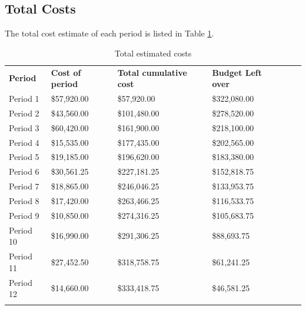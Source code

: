 \subsection{Total Costs}

The total cost estimate of each period is listed in Table \ref{tab:totalcosts}.


\begin{table}[]
\centering
\caption{Total estimated costs}
\label{tab:totalcosts}
\begin{tabular}{llllll}
\textbf{Period} & \textbf{Cost of period} & \textbf{Total cumulative cost} & \textbf{Budget Left over}           &  &  \\
Period 1        & \$57,920.00             & \$57,920.00                    & \$322,080.00                        &  &  \\
Period 2        & \$43,560.00             & \$101,480.00                   & \$278,520.00                        &  &  \\
Period 3        & \$60,420.00             & \$161,900.00                   & \$218,100.00                        &  &  \\
Period 4        & \$15,535.00             & \$177,435.00                   & \$202,565.00                        &  &  \\
Period 5        & \$19,185.00             & \$196,620.00                   & \$183,380.00                        &  &  \\
Period 6        & \$30,561.25             & \$227,181.25                   & \$152,818.75                        &  &  \\
Period 7        & \$18,865.00             & \$246,046.25                   & \$133,953.75                        &  &  \\
Period 8        & \$17,420.00             & \$263,466.25                   & \$116,533.75                        &  &  \\
Period 9        & \$10,850.00             & \$274,316.25                   & \$105,683.75                        &  &  \\
Period 10       & \$16,990.00             & \$291,306.25                   & \$88,693.75                         &  &  \\
Period 11       & \$27,452.50             & \$318,758.75                   & \$61,241.25                         &  &  \\
Period 12       & \$14,660.00             & \$333,418.75                   & \cellcolor[HTML]{9AFF99}\$46,581.25 &  &  \\
                &                         &                                &                                     &  & 
\end{tabular}
\end{table}

